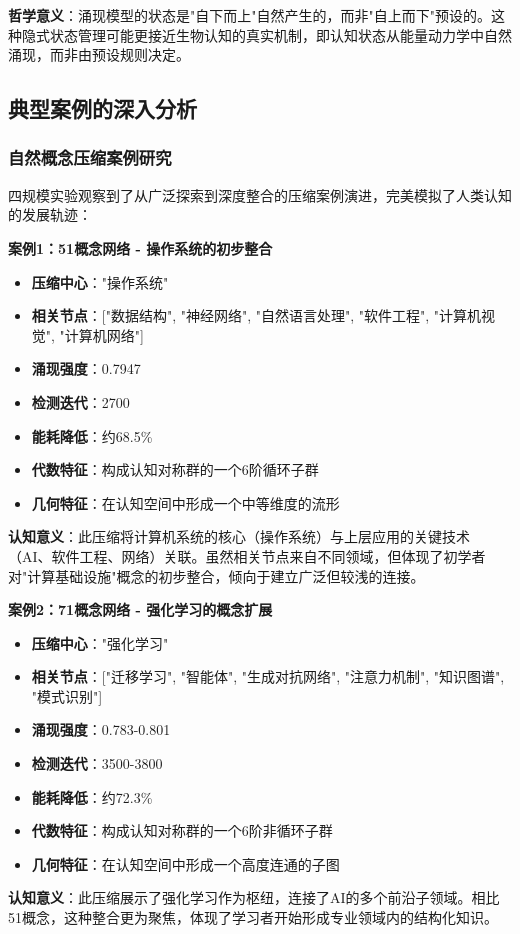 \documentclass[12pt,a4paper]{article}
\begin{document}
\textbf{哲学意义}：涌现模型的状态是"自下而上"自然产生的，而非"自上而下"预设的。这种隐式状态管理可能更接近生物认知的真实机制，即认知状态从能量动力学中自然涌现，而非由预设规则决定。

\subsection{典型案例的深入分析}

\subsubsection{自然概念压缩案例研究}

四规模实验观察到了从广泛探索到深度整合的压缩案例演进，完美模拟了人类认知的发展轨迹：

\textbf{案例1：51概念网络 - 操作系统的初步整合}
\begin{itemize}
\item \textbf{压缩中心}："操作系统"
\item \textbf{相关节点}：["数据结构", "神经网络", "自然语言处理", "软件工程", "计算机视觉", "计算机网络"]
\item \textbf{涌现强度}：0.7947
\item \textbf{检测迭代}：2700
\item \textbf{能耗降低}：约68.5\%
\item \textbf{代数特征}：构成认知对称群的一个6阶循环子群
\item \textbf{几何特征}：在认知空间中形成一个中等维度的流形
\end{itemize}
\textbf{认知意义}：此压缩将计算机系统的核心（操作系统）与上层应用的关键技术（AI、软件工程、网络）关联。虽然相关节点来自不同领域，但体现了初学者对"计算基础设施"概念的初步整合，倾向于建立广泛但较浅的连接。

\textbf{案例2：71概念网络 - 强化学习的概念扩展}
\begin{itemize}
\item \textbf{压缩中心}："强化学习"
\item \textbf{相关节点}：["迁移学习", "智能体", "生成对抗网络", "注意力机制", "知识图谱", "模式识别"]
\item \textbf{涌现强度}：0.783-0.801
\item \textbf{检测迭代}：3500-3800
\item \textbf{能耗降低}：约72.3\%
\item \textbf{代数特征}：构成认知对称群的一个6阶非循环子群
\item \textbf{几何特征}：在认知空间中形成一个高度连通的子图
\end{itemize}
\textbf{认知意义}：此压缩展示了强化学习作为枢纽，连接了AI的多个前沿子领域。相比51概念，这种整合更为聚焦，体现了学习者开始形成专业领域内的结构化知识。
\end{document}
